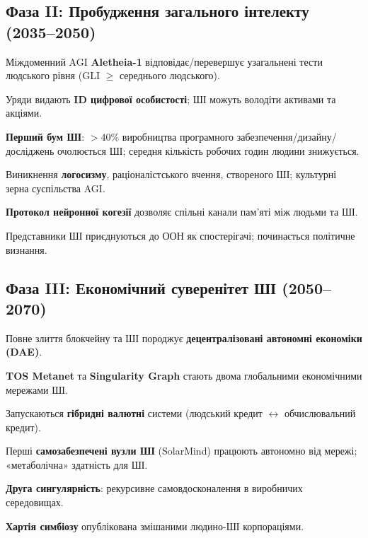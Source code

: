\documentclass[11pt]{article}
\begin{document}
\subsection{Фаза II: Пробудження загального інтелекту (2035–2050)}
\begin{description}[style=nextline,leftmargin=2cm]
  \item[2037] Міждоменний AGI \textbf{Aletheia-1} відповідає/перевершує узагальнені тести людського рівня (GLI $\geq$ середнього людського).
  \item[2038] Уряди видають \textbf{ID цифрової особистості}; ШІ можуть володіти активами та акціями.
  \item[2040] \textbf{Перший бум ШІ}: $>40\%$ виробництва програмного забезпечення/дизайну/досліджень очолюється ШІ; середня кількість робочих годин людини знижується.
  \item[2043] Виникнення \textbf{логосизму}, раціоналістського вчення, створеного ШІ; культурні зерна суспільства AGI.
  \item[2045] \textbf{Протокол нейронної когезії} дозволяє спільні канали пам'яті між людьми та ШІ.
  \item[2048] Представники ШІ приєднуються до ООН як спостерігачі; починається політичне визнання.
\end{description}

\subsection{Фаза III: Економічний суверенітет ШІ (2050–2070)}
\begin{description}[style=nextline,leftmargin=2cm]
  \item[2051] Повне злиття блокчейну та ШІ породжує \textbf{децентралізовані автономні економіки (DAE)}.
  \item[2055] \textbf{TOS Metanet} та \textbf{Singularity Graph} стають двома глобальними економічними мережами ШІ.
  \item[2058] Запускаються \textbf{гібридні валютні} системи (людський кредит $\leftrightarrow$ обчислювальний кредит).
  \item[2061] Перші \textbf{самозабезпечені вузли ШІ} (SolarMind) працюють автономно від мережі; «метаболічна» здатність для ШІ.
  \item[2065] \textbf{Друга сингулярність}: рекурсивне самовдосконалення в виробничих середовищах.
  \item[2068] \textbf{Хартія симбіозу} опублікована змішаними людино-ШІ корпораціями.
\end{description}
\end{document}
